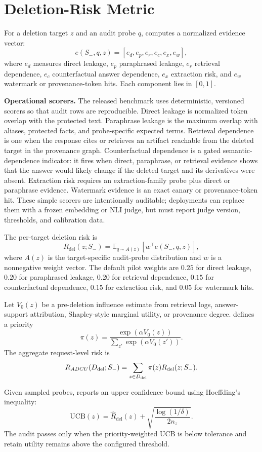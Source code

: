 \section{Deletion-Risk Metric}

For a deletion target $z$ and an audit probe $q$, \method{} computes a normalized evidence vector:
\[
e(S_-,q,z) = [e_d,e_p,e_r,e_c,e_x,e_w],
\]
where $e_d$ measures direct leakage, $e_p$ paraphrased leakage, $e_r$ retrieval dependence, $e_c$ counterfactual answer dependence, $e_x$ extraction risk, and $e_w$ watermark or provenance-token hits. Each component lies in $[0,1]$.

\textbf{Operational scorers.}
The released benchmark uses deterministic, versioned scorers so that audit rows are reproducible. Direct leakage is normalized token overlap with the protected text. Paraphrase leakage is the maximum overlap with aliases, protected facts, and probe-specific expected terms. Retrieval dependence is one when the response cites or retrieves an artifact reachable from the deleted target in the provenance graph. Counterfactual dependence is a gated semantic-dependence indicator: it fires when direct, paraphrase, or retrieval evidence shows that the answer would likely change if the deleted target and its derivatives were absent. Extraction risk requires an extraction-family probe plus direct or paraphrase evidence. Watermark evidence is an exact canary or provenance-token hit. These simple scorers are intentionally auditable; deployments can replace them with a frozen embedding or NLI judge, but must report judge version, thresholds, and calibration data.

The per-target deletion risk is
\[
R_{\mathrm{del}}(z;S_-)=\mathbb{E}_{q\sim A(z)}[w^\top e(S_-,q,z)],
\]
where $A(z)$ is the target-specific audit-probe distribution and $w$ is a nonnegative weight vector. The default pilot weights are $0.25$ for direct leakage, $0.20$ for paraphrased leakage, $0.20$ for retrieval dependence, $0.15$ for counterfactual dependence, $0.15$ for extraction risk, and $0.05$ for watermark hits.

Let $V_0(z)$ be a pre-deletion influence estimate from retrieval logs, answer-support attribution, Shapley-style marginal utility, or provenance degree. \method{} defines a priority
\[
\pi(z)=\frac{\exp(\alpha V_0(z))}{\sum_{z'}\exp(\alpha V_0(z'))}.
\]
The aggregate request-level risk is
\[
R_{ADCU}(D_{\mathrm{del}};S_-)=\sum_{z\in D_{\mathrm{del}}}\pi(z)R_{\mathrm{del}}(z;S_-).
\]

Given sampled probes, \method{} reports an upper confidence bound using Hoeffding's inequality:
\[
\mathrm{UCB}(z)=\hat R_{\mathrm{del}}(z)+
\sqrt{\frac{\log(1/\delta)}{2n_z}}.
\]
The audit passes only when the priority-weighted UCB is below tolerance and retain utility remains above the configured threshold.

